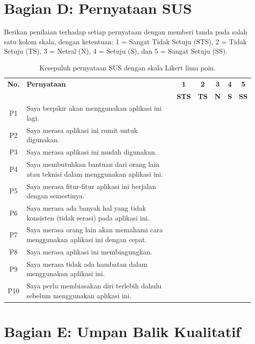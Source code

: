 \section*{Bagian D: Pernyataan SUS}

Berikan penilaian terhadap setiap pernyataan dengan memberi tanda pada salah satu kolom skala, dengan ketentuan: 1 = Sangat Tidak Setuju (STS), 2 = Tidak Setuju (TS), 3 = Netral (N), 4 = Setuju (S), dan 5 = Sangat Setuju (SS).

\begin{table}[htbp]
\centering
\small
\caption{Kesepuluh pernyataan SUS dengan skala Likert lima poin.}
\label{tab:form-sus}
\begin{tabular}{c p{7.2cm} c c c c c}
\toprule
\textbf{No.} & \textbf{Pernyataan} & \textbf{1} & \textbf{2} & \textbf{3} & \textbf{4} & \textbf{5} \\
 & & \textbf{STS} & \textbf{TS} & \textbf{N} & \textbf{S} & \textbf{SS} \\
\midrule
P1 & Saya berpikir akan menggunakan aplikasi ini lagi. & & & & & \\
\addlinespace
P2 & Saya merasa aplikasi ini rumit untuk digunakan. & & & & & \\
\addlinespace
P3 & Saya merasa aplikasi ini mudah digunakan. & & & & & \\
\addlinespace
P4 & Saya membutuhkan bantuan dari orang lain atau teknisi dalam menggunakan aplikasi ini. & & & & & \\
\addlinespace
P5 & Saya merasa fitur-fitur aplikasi ini berjalan dengan semestinya. & & & & & \\
\addlinespace
P6 & Saya merasa ada banyak hal yang tidak konsisten (tidak serasi) pada aplikasi ini. & & & & & \\
\addlinespace
P7 & Saya merasa orang lain akan memahami cara menggunakan aplikasi ini dengan cepat. & & & & & \\
\addlinespace
P8 & Saya merasa aplikasi ini membingungkan. & & & & & \\
\addlinespace
P9 & Saya merasa tidak ada hambatan dalam menggunakan aplikasi ini. & & & & & \\
\addlinespace
P10 & Saya perlu membiasakan diri terlebih dahulu sebelum menggunakan aplikasi ini. & & & & & \\
\bottomrule
\end{tabular}
\end{table}

\section*{Bagian E: Umpan Balik Kualitatif}

